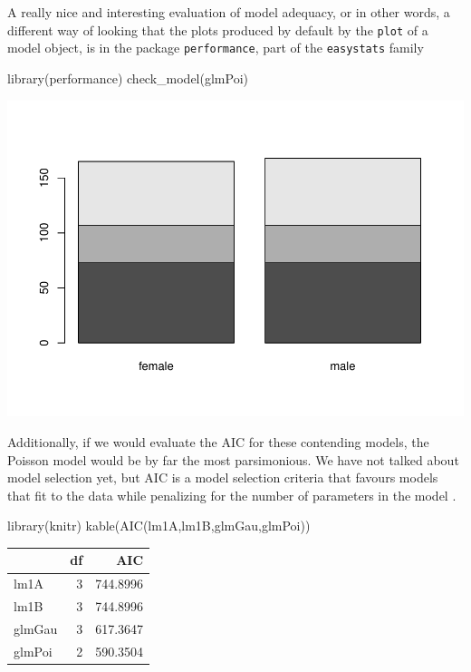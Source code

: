 \documentclass[
]{book}
\newenvironment{Shaded}{\begin{snugshade}}{\end{snugshade}}
\newcommand{\FunctionTok}[1]{\textcolor[rgb]{0.00,0.00,0.00}{#1}}
\newcommand{\NormalTok}[1]{#1}
\begin{document}
A really nice and interesting evaluation of model adequacy, or in other words, a different way of looking that the plots produced by default by the \texttt{plot} of a model object, is in the package \texttt{performance}, part of the \texttt{easystats} family

\begin{Shaded}
\begin{Highlighting}[]
\FunctionTok{library}\NormalTok{(performance)}
\FunctionTok{check\_model}\NormalTok{(glmPoi)}
\end{Highlighting}
\end{Shaded}

\includegraphics{ECOMODbook_files/figure-latex/unnamed-chunk-3-1.pdf}

Additionally, if we would evaluate the AIC for these contending models, the Poisson model would be by far the most parsimonious. We have not talked about model selection yet, but AIC is a model selection criteria that favours models that fit to the data while penalizing for the number of parameters in the model \citep[e.g.][]{Aho2014}.

\begin{Shaded}
\begin{Highlighting}[]
\FunctionTok{library}\NormalTok{(knitr)}
\FunctionTok{kable}\NormalTok{(}\FunctionTok{AIC}\NormalTok{(lm1A,lm1B,glmGau,glmPoi))}
\end{Highlighting}
\end{Shaded}

\begin{tabular}{l|r|r}
\hline
  & df & AIC\\
\hline
lm1A & 3 & 744.8996\\
\hline
lm1B & 3 & 744.8996\\
\hline
glmGau & 3 & 617.3647\\
\hline
glmPoi & 2 & 590.3504\\
\hline
\end{tabular}
\end{document}
